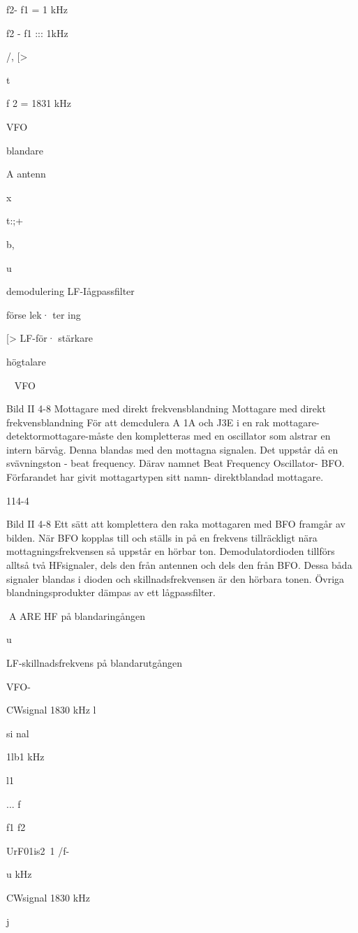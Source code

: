 f2- f1 = 1 kHz

f2 - f1 ::: 1kHz

/,
[>

t
~

f 2 = 1831 kHz

VFO

blandare

A
antenn

x

t:;+

b,

u

demodulering LF-Iågpassfilter

förse lek·
ter ing

[>
LF-för·
stärkare

högtalare

~
VFO

Bild II 4-8 Mottagare med direkt frekvensblandning
Mottagare med direkt frekvensblandning
För att demcdulera A 1A och J3E i en rak
mottagare- detektormottagare-måste den
kompletteras med en oscillator som alstrar
en intern bärvåg. Denna blandas med den
mottagna signalen. Det uppstår då en svävningston - beat frequency. Därav namnet
Beat Frequency Oscillator- BFO.
Förfarandet har givit mottagartypen sitt
namn- direktblandad mottagare.

114-4

Bild II 4-8
Ett sätt att komplettera den raka mottagaren
med BFO framgår av bilden. När BFO kopplas till och ställs in på en frekvens tillräckligt
nära mottagningsfrekvensen så uppstår en
hörbar ton.
Demodulatordioden tillförs alltså två HFsignaler, dels den från antennen och dels
den från BFO. Dessa båda signaler blandas
i dioden och skillnadsfrekvensen är den
hörbara tonen. Övriga blandningsprodukter
dämpas av ett lågpassfilter.

A ARE
HF på blandaringången

u~

LF-skillnadsfrekvens på
blandarutgången

VFO-

CWsignal
1830 kHz
l

si nal

1lb1 kHz

l1

... f

f1 f2

UrF01is2~1
/f-

u
kHz

CWsignal 1830 kHz

j

